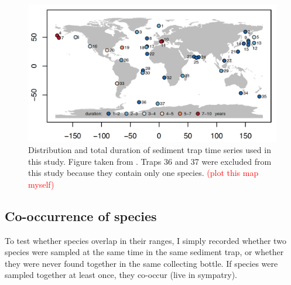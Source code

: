 \begin{figure}
\centering
\includegraphics[width=1\textwidth]{traps_map.png}
\caption{\label{fig:map} Distribution and total duration of sediment trap time series used in this study. Figure taken from \citep{jonkers2015global}. Traps 36 and 37 were excluded from this study because they contain only one species. \textcolor{red}{(plot this map myself)}}
\end{figure}

\begin{table}
\footnotesize
\caption{\label{table:traps_data} Meta-data of sediment traps taken from \citep{jonkers2015global}. Columns: \textbf{Trap number} as in Figure \ref{fig:map}; \textbf{Trap name}; Coordinates (\textbf{Lat, Lon}); \textbf{resolution}: mean period (in days) that each sample (bottle) in the trap was open; \textbf{length days}: total period trap was open (in days); \textbf{length years}: total period in years; \textbf{length series}: total number of samples collected in each trap (length of the time-series); \textbf{from, to}: year interval when trap was active; \textbf{all ssp}: whether all species were identified in each trap, "NO" means that just dominant species were picked.}
\makebox[\linewidth]{ %

}
\end{table}


\subsection{Co-occurrence of species}

To test whether species overlap in their ranges, I simply recorded whether two species were sampled at the same time in the same sediment trap, or whether they were never found together in the same collecting bottle. If species were sampled together at least once, they co-occur (live in sympatry). 

